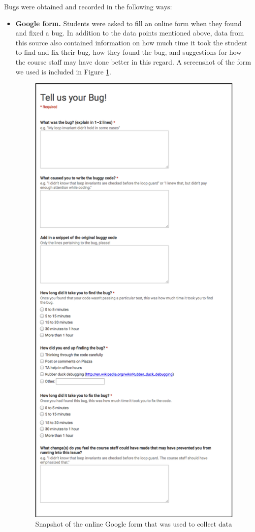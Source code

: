 \documentclass[11pt,letterpaper]{article}
\begin{document}
Bugs were obtained and recorded in the following ways:
\begin{itemize}
\item{\textbf{Google form.} Students were asked to fill an online form when they found and fixed a bug. In addition to the data points mentioned above, data from this source also contained information on how much time it took the student to find and fix their bug, how they found the bug, and suggestions for how the course staff may have done better in this regard. A screenshot of the form we used is included in Figure \ref{fig:form}}.
\begin{figure}
\centering
\includegraphics[scale=0.41]{figures/form.png}
\caption{Snapshot of the online Google form that was used to collect data}
\label{fig:form}
\end{figure}


\end{itemize}
\end{document}
